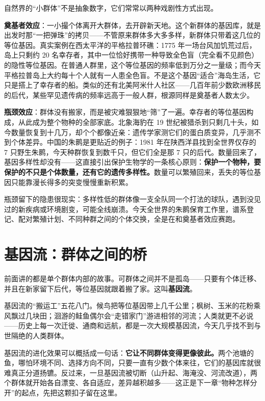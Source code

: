 自然界的“小群体”不是抽象数字，它们常常以两种戏剧性方式出现。

\textbf{奠基者效应}：一小撮个体离开大群体，去开辟新天地。这个新群体的基因库，就是出发时那“一把弹珠”的拷贝——不管原来群体多大多多样，新群体只带着这几位的等位基因。真实案例在西太平洋的平格拉普环礁：1775 年一场台风加饥荒过后，岛上只剩约 20 名幸存者，其中一位恰好携带一种导致全色盲（完全看不见颜色）的隐性等位基因。在普通人群里，这个等位基因的频率低到万分之一量级；而今天平格拉普岛上大约每十个人就有一人患全色盲。不是这个基因“适合”海岛生活，它只是搭上了幸存者的船。类似的还有北美阿米什人社区——几百年前少数欧洲移民的后代，某些罕见遗传病的频率远高于一般人群，根源同样是奠基者人数太少。

\textbf{瓶颈效应}：群体没有搬家，而是被灾难狠狠地“筛”了一遍。幸存者的等位基因构成，从此成为整个物种的全部家底。北象海豹在 19 世纪被猎杀到只剩几十头，如今数量恢复到十几万，却个个都像近亲：遗传学家测它们的蛋白质变异，几乎测不到个体差异。中国的朱鹮是更贴近的例子：1981 年在陕西洋县找到全世界仅存的 7 只野生朱鹮，今天种群恢复到数千只，但它们全是那 7 只的后代。数量回来了，基因多样性却没有——这直接引出保护生物学的一条核心原则：\textbf{保护一个物种，要保护的不只是个体数量，还有它的遗传多样性。}数量可以繁殖回来，丢失的等位基因只能靠漫长得多的突变慢慢重新积累。

瓶颈留下的隐患很现实：多样性低的群体像一支全队同一个打法的球队，遇到没见过的新疾病或环境剧变，可能全线崩溃。今天全世界的朱鹮保育工作里，谱系登记、配对繁殖计划、不同种群之间的个体交换，全是在和奠基者效应赛跑。

\section{基因流：群体之间的桥}

前面讲的都是单个群体内部的故事。可群体之间并不是孤岛——只要有个体迁移、并且在新家留下后代，等位基因就跟着搬了家。这叫\textbf{基因流}。

基因流的“搬运工”五花八门。候鸟把等位基因带上几千公里；枫树、玉米的花粉乘风飘过几块田；洄游的鲑鱼偶尔会“走错家门”游进相邻的河流；人类就更不必说——历史上每一次迁徙、通商和远航，都是一次大规模基因流，今天几乎找不到与世隔绝的人类群体。

基因流的进化效果可以概括成一句话：\textbf{它让不同群体变得更像彼此。}两个池塘的鱼，哪怕环境不同、选择方向不同，只要一直有少数个体来往，它们的基因库就很难真正分道扬镳。反过来，一旦基因流被切断（山升起、海淹没、河流改道），两个群体就开始各自漂变、各自适应，差异越积越多——这正是下一章“物种怎样分开”的起点，先把这颗扣子留在这里。

